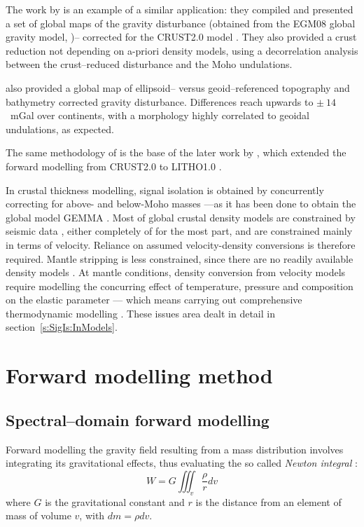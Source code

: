 The work by \textcite{Tenzer2009} is an example of a similar application: they compiled and presented a set of global maps of the gravity disturbance (obtained from the EGM08 global gravity model, \cite{Pavlis2012EGM2008})-- corrected for the {CRUST2.0} model \parencite{Bassin2000Crust20}.
They also provided a crust reduction not depending on a-priori density models, using a decorrelation analysis between the crust--reduced disturbance and the Moho undulations.

\Textcite{Tenzer2009} also provided a global map of ellipsoid-- versus geoid--referenced topography and bathymetry corrected gravity disturbance.
Differences reach upwards to $\pm~14$~\si{\milli Gal} over continents, with a morphology highly correlated to geoidal undulations, as expected.

The same methodology of \textcite{Tenzer2009} is the base of the later work by \textcite{Tenzer2019}, which extended the forward modelling from {CRUST2.0} to {LITHO1.0} \parencite{Pasyanos2014}.

In crustal thickness modelling, signal isolation is obtained by concurrently correcting for above- and below-Moho masses ---as it has been done to obtain the global model {GEMMA} \parencites{Reguzzoni2013}{Reguzzoni2015}.
Most of global crustal density models are constrained by seismic data \parencites[e.g.][]{Laske2012Crust10}{Pasyanos2014}{Szwillus2019}, either completely of for the most part, and are constrained mainly in terms of velocity.
Reliance on assumed velocity-density conversions \parencite[e.g.][]{Sebera2018} is therefore required.
Mantle stripping is less constrained, since there are no readily available density models \parencite{Tenzer2015}.
At mantle conditions, density conversion from velocity models \parencites[e.g.][]{Simmons2010}{Schaeffer2013} require modelling the concurring effect of temperature, pressure and composition on the elastic parameter --- which means carrying out comprehensive thermodynamic modelling \parencites{Connolly2005}{Connolly2009}.
These issues area dealt in detail in section~\ref{s:SigIs:InModels}.

\section{Forward modelling method}
\label{s:SigIs:Fwd}

\subsection{Spectral--domain forward modelling}
\label{ss:SigIs:Fwd:SHfwd}
Forward modelling the gravity field resulting from a mass distribution involves integrating its gravitational effects, thus evaluating the so called \textit{Newton integral} \parencite{HofmannWellenhof2006}:
\begin{equation}
    \label{eq:SHfwd:NewtonInt}
    W = G \iiint_v \frac{\rho}{r}dv
\end{equation}
where $G$ is the gravitational constant and $r$ is the distance from an element of mass of volume $v$, with $dm = \rho dv$.

